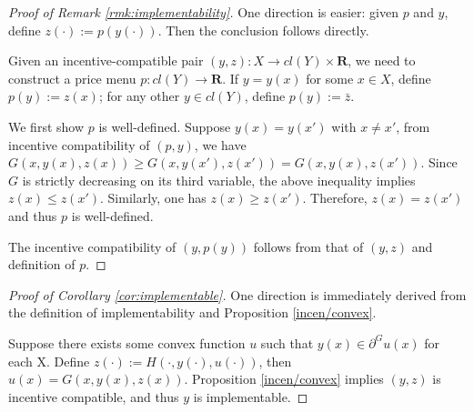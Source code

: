 \documentclass[a4paper, 11pt]{amsart}
\numberwithin{equation}{section}
\theoremstyle{plain}
\theoremstyle{definition}
\theoremstyle{remark}
\newcommand{\R}{\mathbf{R}}
\begin{document}
\vspace{0.3cm}

\begin{proof}[Proof of Remark \ref{rmk:implementability}]
	One direction is easier: given $p$ and $y$, define $z(\cdot):= p(y(\cdot))$. Then the conclusion follows directly. \medskip
	
	Given an incentive-compatible pair $(y, z): X \rightarrow cl(Y) \times \R$, we need to construct a price menu $p: cl(Y)\rightarrow \R$. If $y= y(x)$ for some $x\in X$, define $p(y):= z(x)$; for any other $y \in cl(Y)$, define $p(y) := \bar{z}$. \medskip
	
	We first show $p$ is well-defined. Suppose $y(x) = y(x')$ with $x\ne x'$, from incentive compatibility of $(p,y)$, we have $G(x,y(x), z(x)) \ge G(x, y(x'), z(x')) = G(x, y(x), z(x'))$. Since $G$ is strictly decreasing on its third variable, the above inequality implies $z(x) \le z(x')$. Similarly, one has $z(x) \ge z(x')$. Therefore, $z(x) = z(x')$ and thus $p$ is well-defined. \medskip
	
	The incentive compatibility of $(y, p(y))$ follows from that of $(y, z)$ and definition of $p$.
\end{proof}
\vspace{0.3cm}
\begin{proof}[Proof of Corollary \ref{cor:implementable}]
	One direction is immediately derived from the definition of implementability and Proposition \ref{incen/convex}.\medskip
	
	Suppose there exists some convex function $u$ such that $y(x) \in \partial^G u(x)$ for each X. Define $z(\cdot):= H(\cdot, y(\cdot), u(\cdot))$, then $u(x) = G(x, y(x), z(x))$.
	Proposition \ref{incen/convex} implies $(y, z)$ is incentive compatible, and thus $y$ is implementable.
\end{proof}
\vspace{0.3cm}
\end{document}
